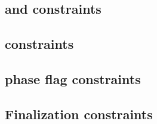 \subsection{\ct{} and \maxCt{} constraints}                                                              \label{rlp auth: generalities: ct and ct_max}                              
\subsection{\rlpAuthUtilsColumnSizeCountdown{} constraints}                                              \label{rlp auth: generalities: byte size countdown constraints}            
\subsection{\utils{} phase flag constraints}                                                             \label{rlp auth: generalities: utils phase flag constraints}               
\subsection{Finalization constraints}                                                                    \label{rlp auth: generalities: finalization}                               
